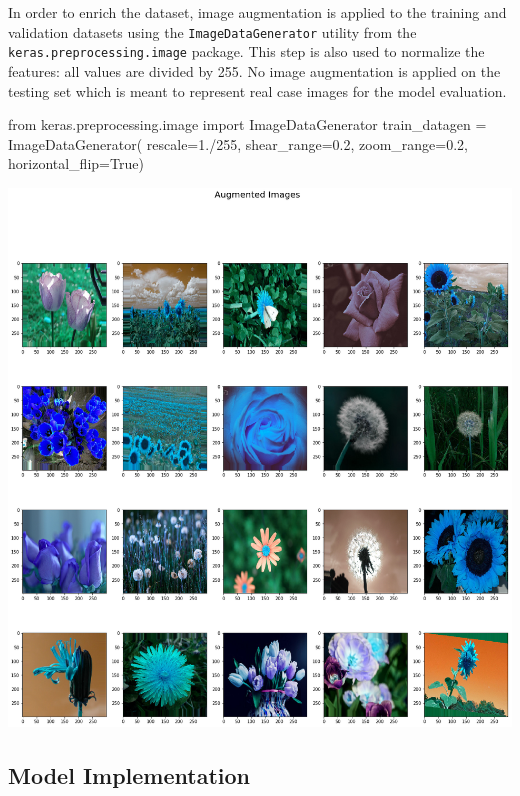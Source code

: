 In order to enrich the dataset, image augmentation is applied to the training and validation datasets using the \texttt{ImageDataGenerator} utility from the \texttt{keras.preprocessing.image} package. This step is also used to normalize the features: all values are divided by 255. 
No image augmentation is applied on the testing set which is meant to represent real case images for the model evaluation. 

\begin{python}
	from keras.preprocessing.image import ImageDataGenerator
	train_datagen = ImageDataGenerator(
	rescale=1./255,
	shear_range=0.2,
	zoom_range=0.2,
	horizontal_flip=True)
\end{python}

\begin{center}
	\includegraphics[scale=.3]{./sections/03_methodology/output_26_0.png}
\end{center}

\subsection{Model Implementation}

